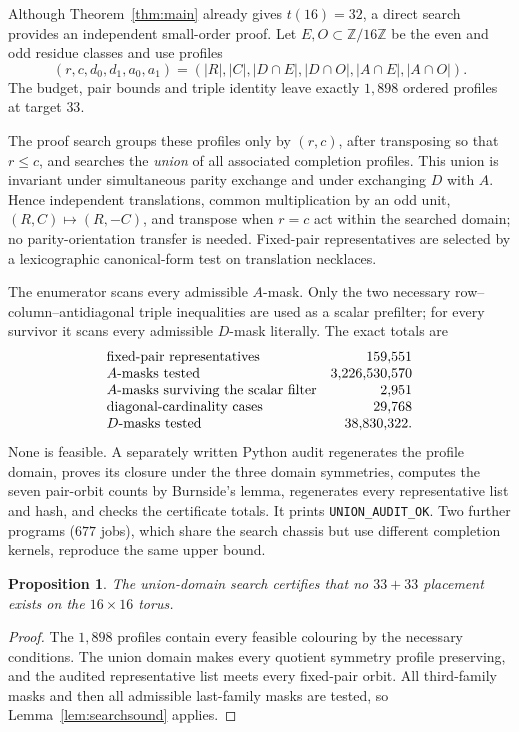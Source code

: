 \documentclass[11pt]{amsart}
\newtheorem{proposition}[theorem]{Proposition}
\theoremstyle{definition}
\theoremstyle{remark}
\newcommand{\Z}{\mathbb{Z}}
\newcommand{\bs}{\discretionary{}{}{}}
\begin{document}
Although Theorem~\ref{thm:main} already gives $t(16)=32$, a direct search
provides an independent small-order proof.  Let $E,O\subset\Z/16\Z$ be the
even and odd
residue classes and use profiles
\[
(r,c,d_0,d_1,a_0,a_1)
=(|R|,|C|,|D\cap E|,|D\cap O|,|A\cap E|,|A\cap O|).
\]
The budget, pair bounds and triple identity leave exactly $1{,}898$ ordered
profiles at target $33$.

The proof search groups these profiles only by $(r,c)$, after transposing so
that $r\le c$, and searches the \emph{union} of all associated completion
profiles.  This union is invariant under simultaneous parity exchange and
under exchanging $D$ with $A$.  Hence independent translations, common
multiplication by an odd unit, $(R,C)\mapsto(R,-C)$, and transpose when
$r=c$ act within the searched domain; no parity-orientation transfer is
needed.  Fixed-pair representatives are selected by a lexicographic
canonical-form test on translation necklaces.

The enumerator scans every admissible $A$-mask.  Only the two necessary
row--column--antidiagonal triple inequalities are used as a scalar prefilter;
for every survivor it scans every admissible $D$-mask literally.  The exact
totals are
\[
\begin{array}{@{}lr@{}}
\text{fixed-pair representatives}&159{,}551\\
A\text{-masks tested}&3{,}226{,}530{,}570\\
A\text{-masks surviving the scalar filter}&2{,}951\\
\text{diagonal-cardinality cases}&29{,}768\\
D\text{-masks tested}&38{,}830{,}322 .
\end{array}
\]
None is feasible.  A separately written Python audit regenerates the profile
domain, proves its closure under the three domain symmetries, computes the
seven pair-orbit counts by Burnside's lemma, regenerates every representative
list and hash, and checks the certificate totals.  It prints
\texttt{UNION\_\bs{}AUDIT\_\bs{}OK}.  Two further programs ($677$ jobs),
which share the search chassis but use different completion kernels,
reproduce the same upper bound.

\begin{proposition}\label{prop:t16sweep}
The union-domain search certifies that no $33+33$ placement exists on the
$16\times16$ torus.
\end{proposition}

\begin{proof}
The $1{,}898$ profiles contain every feasible colouring by the necessary
conditions.  The union domain makes every quotient symmetry profile
preserving, and the audited representative list meets every fixed-pair
orbit.  All third-family masks and then all admissible last-family masks are
tested, so Lemma~\ref{lem:searchsound} applies.
\end{proof}
\end{document}
